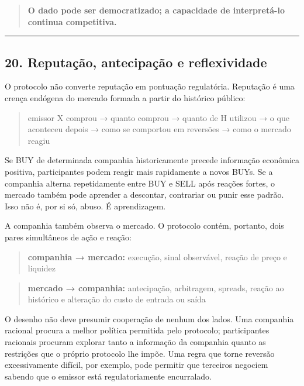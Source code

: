 \documentclass[
  a4paper,
]{article}
\begin{document}
\begin{quote}
\textbf{O dado pode ser democratizado; a capacidade de interpretá-lo
continua competitiva.}
\end{quote}

\begin{center}\rule{0.5\linewidth}{0.5pt}\end{center}

\hypertarget{20-reputacao-antecipacao-e-reflexividade}{}

\hypertarget{20-reputauxe7uxe3o-antecipauxe7uxe3o-e-reflexividade}{%
\subsection{20. Reputação, antecipação e
reflexividade}\label{20-reputauxe7uxe3o-antecipauxe7uxe3o-e-reflexividade}}

O protocolo não converte reputação em pontuação regulatória. Reputação é
uma crença endógena do mercado formada a partir do histórico público:

\begin{quote}
emissor X comprou → quanto comprou → quanto de H utilizou → o que
aconteceu depois → como se comportou em reversões → como o mercado
reagiu
\end{quote}

Se BUY de determinada companhia historicamente precede informação
econômica positiva, participantes podem reagir mais rapidamente a novos
BUYs. Se a companhia alterna repetidamente entre BUY e SELL após reações
fortes, o mercado também pode aprender a descontar, contrariar ou punir
esse padrão. Isso não é, por si só, abuso. É aprendizagem.

A companhia também observa o mercado. O protocolo contém, portanto, dois
pares simultâneos de ação e reação:

\begin{quote}
\textbf{companhia → mercado:} execução, sinal observável, reação de
preço e liquidez
\end{quote}

\begin{quote}
\textbf{mercado → companhia:} antecipação, arbitragem, spreads, reação
ao histórico e alteração do custo de entrada ou saída
\end{quote}

O desenho não deve presumir cooperação de nenhum dos lados. Uma
companhia racional procura a melhor política permitida pelo protocolo;
participantes racionais procuram explorar tanto a informação da
companhia quanto as restrições que o próprio protocolo lhe impõe. Uma
regra que torne reversão excessivamente difícil, por exemplo, pode
permitir que terceiros negociem sabendo que o emissor está
regulatoriamente encurralado.
\end{document}
